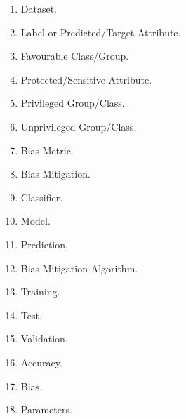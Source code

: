 \documentclass[sigconf,review]{acmart}
\begin{document}
\begin{enumerate}
	\item Dataset.
	\item Label or Predicted/Target Attribute.
	\item Favourable Class/Group.
	\item Protected/Sensitive Attribute.
	\item Privileged Group/Class.
	\item Unprivileged Group/Class.
	\item Bias Metric.
	\item Bias Mitigation.
	\item Classifier.
	\item Model.
	\item Prediction.
	\item Bias Mitigation Algorithm.
	\item Training.
	\item Test.
	\item Validation.
	\item Accuracy.
	\item Bias.
	\item Parameters.
\end{enumerate}

   

\end{document}
